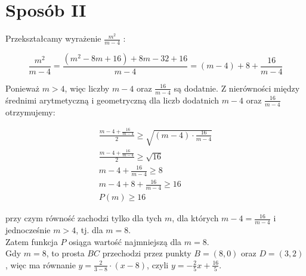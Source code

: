 \documentclass[10pt]{article}
\begin{document}
\section*{Sposób II}
Przekształcamy wyrażenie $\frac{m^{2}}{m-4}$ :

$$
\frac{m^{2}}{m-4}=\frac{\left(m^{2}-8 m+16\right)+8 m-32+16}{m-4}=(m-4)+8+\frac{16}{m-4}
$$

Ponieważ $m>4$, więc liczby $m-4$ oraz $\frac{16}{m-4}$ są dodatnie. Z nierówności między średnimi arytmetyczną i geometryczną dla liczb dodatnich $m-4$ oraz $\frac{16}{m-4}$ otrzymujemy:

$$
\begin{gathered}
\frac{m-4+\frac{16}{m-4}}{2} \geq \sqrt{(m-4) \cdot \frac{16}{m-4}} \\
\frac{m-4+\frac{16}{m-4}}{2} \geq \sqrt{16} \\
m-4+\frac{16}{m-4} \geq 8 \\
m-4+8+\frac{16}{m-4} \geq 16 \\
P(m) \geq 16
\end{gathered}
$$

przy czym równość zachodzi tylko dla tych $m$, dla których $m-4=\frac{16}{m-4}$ i jednocześnie $m>4$, tj. dla $m=8$.\\
Zatem funkcja $P$ osiąga wartość najmniejszą dla $m=8$.\\
Gdy $m=8$, to prosta $B C$ przechodzi przez punkty $B=(8,0)$ oraz $D=(3,2)$, więc ma równanie $y=\frac{2}{3-8} \cdot(x-8)$, czyli $y=-\frac{2}{5} x+\frac{16}{5}$.
\end{document}
